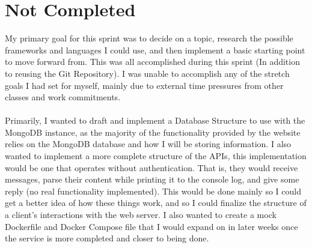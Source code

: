 \documentclass{article}
\begin{document}
\section{Not Completed}
My primary goal for this sprint was to decide on a topic, research the possible frameworks and languages I could use, and then implement a basic starting point to move forward from. This was all accomplished during this sprint (In addition to reusing the Git Repository). I was unable to accomplish any of the stretch goals I had set for myself, mainly due to external time pressures from other classes and work commitments.\\\\
Primarily, I wanted to draft and implement a Database Structure to use with the MongoDB instance, as the majority of the functionality provided by the website relies on the MongoDB database and how I will be storing information. I also wanted to implement a more complete structure of the APIs, this implementation would be one that operates without authentication. That is, they would receive messages, parse their content while printing it to the console log, and give some reply (no real functionality implemented). This would be done  mainly so I could get a better idea of how these things work, and so I could finalize the structure of a client's interactions with the web server. I also wanted to create a mock Dockerfile and Docker Compose file that I would expand on in later weeks once the service is more completed and closer to being done. 
\end{document}

